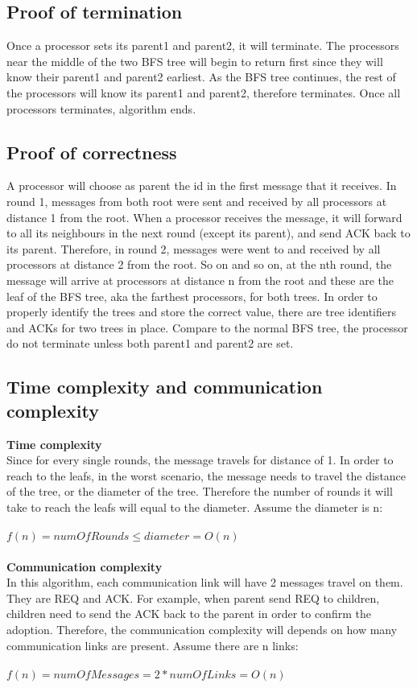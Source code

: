 \documentclass[12pt,letterpaper]{article}
\begin{document}
\subsection* {Proof of termination}
Once a processor sets its parent1 and parent2, it will terminate. The processors near the middle of the two BFS tree will begin to return first since they will know their parent1 and parent2 earliest. As the BFS tree continues, the rest of the processors will know its parent1 and parent2, therefore terminates. Once all processors  terminates, algorithm ends. 
\subsection* {Proof of correctness}
A processor will choose as parent the id in the first message that it receives. In round 1, messages from both root were sent and received by all processors at distance 1 from the root. When a processor receives the message, it will forward to all its neighbours in the next round (except its parent), and send ACK back to its parent. Therefore, in round 2, messages were went to and received by all processors at distance 2 from the root. So on and so on, at the nth round, the message will arrive at processors at distance n from the root and these are the leaf of the BFS tree, aka the farthest processors, for both trees. In order to properly identify the trees and store the correct value, there are tree identifiers and ACKs for two trees in place. Compare to the normal BFS tree, the processor do not terminate unless both parent1 and parent2 are set. 

\subsection* {Time complexity and communication complexity}
\textbf{Time complexity} \\
Since for every single rounds, the message travels for distance of 1. In order to reach to the leafs, in the worst scenario, the message needs to travel the distance of the tree, or the diameter of the tree. Therefore the number of rounds it will take to reach the leafs will equal to the diameter. Assume the diameter is n:\\ \\
$f(n) = numOfRounds \leq diameter = O(n)$ \\ \\
\textbf{Communication complexity} \\
In this algorithm, each communication link will have 2 messages travel on them. They are REQ and ACK. For example, when parent send REQ to children, children need to send the ACK back to the parent in order to confirm the adoption. Therefore, the communication complexity will depends on how many communication links are present. Assume there are n links: \\ \\
$f(n) = numOfMessages = 2 * numOfLinks = O(n)$
\end{document}
